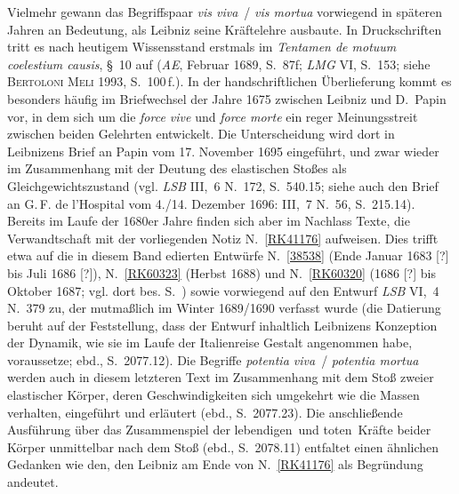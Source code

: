 \begin{ledgroup}
Vielmehr gewann das Begriffspaar \textit{vis viva}~/ \textit{vis mortua} vorwiegend in späteren Jahren an Bedeutung, als Leibniz seine Kräftelehre ausbaute.
In Druckschriften tritt es nach heutigem Wissensstand erstmals im \textit{Tentamen de motuum coelestium causis}, §~10 auf (\textit{AE}, Februar 1689, S.~87f;
\textit{LMG} VI, S.~153;\cite{00543}
siehe \textsc{Bertoloni Meli} 1993, S.~100\,f.).\cite{01357}
In der handschriftlichen Überlieferung kommt es besonders häufig im Briefwechsel der Jahre 1675 zwischen Leibniz und D.~Papin%
\protect{}
vor, in dem sich um die \textit{force vive} und \textit{force morte} ein reger Meinungsstreit zwischen beiden Gelehrten entwickelt.
Die Unterscheidung wird dort in Leibnizens Brief an Papin%
\protect{}
vom 17. November 1695 eingeführt, und zwar wieder im Zusammenhang mit der Deutung des elastischen Stoßes als Gleichgewichtszustand
(vgl. \textit{LSB} III,~6 N.~172, S.~540.15;\cite{01378}
siehe auch den Brief an G.\,F. de l'Hospital vom 4./14. Dezember 1696: III,~7 N.~56, S.~215.14).\cite{01379}%
\pend%
\pstart%
Bereits im Laufe der 1680er Jahre finden sich aber im Nachlass Texte, die Verwandtschaft mit der vorliegenden Notiz N.~\ref{RK41176} aufweisen.
Dies trifft etwa auf die in diesem Band edierten Entwürfe N.~\ref{38538} (Ende Januar 1683 [?] bis Juli 1686 [?]), N.~\ref{RK60323} (Herbst 1688) und N.~\ref{RK60320} %
(1686 [?] bis Oktober 1687; vgl. dort bes. S.~)
%
sowie vorwiegend auf den Entwurf \textit{LSB} VI,~4 N.~379 %
zu, der mutmaßlich im Winter 1689/1690 verfasst wurde (die Datierung beruht auf der Feststellung, dass der Entwurf inhaltlich Leibnizens Konzeption der Dynamik, wie sie im Laufe der Italienreise Gestalt angenommen habe, voraussetze; ebd., S.~2077.12).\cite{01380}
Die Begriffe \textit{potentia viva}~/ \textit{potentia mortua} werden auch in diesem letzteren Text im Zusammenhang mit dem Stoß zweier elastischer Körper, deren Geschwindigkeiten sich umgekehrt wie die Massen verhalten, eingeführt und erläutert (ebd., S.~2077.23).\cite{01380}
Die anschließende Ausführung über das Zusammenspiel der \glqq lebendigen\grqq\ und \glqq toten\grqq\ Kräfte beider Körper unmittelbar nach dem Stoß (ebd., S.~2078.11) entfaltet einen ähnlichen Gedanken wie den, den Leibniz am Ende von N.~\ref{RK41176} als Begründung andeutet.

\end{ledgroup}
